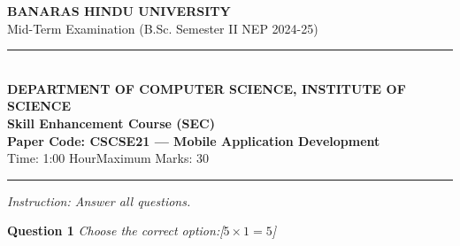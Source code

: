 \documentclass[11pt,a4paper]{article}
\newcommand{\pts}[1]{\hfill   \textit{[#1]}}
\begin{document}
\begin{center}
  {\large\bfseries BANARAS HINDU UNIVERSITY}\\[2pt]
  {\normalsize Mid-Term Examination (B.Sc. Semester II NEP 2024-25)}\\[6pt]
  \rule{0.8\linewidth}{0.5pt}\\[6pt]
  {\large\bfseries DEPARTMENT OF COMPUTER SCIENCE, INSTITUTE OF SCIENCE}\\[4pt]
  {\large\bfseries Skill Enhancement Course (SEC)}\\[4pt]
  {\large\bfseries Paper Code: CSCSE21 --- Mobile Application Development}\\[4pt]
  {\normalsize Time: 1:00 Hour\hfill Maximum Marks: 30}
\end{center}

\rule{\linewidth}{0.4pt}\smallskip



\noindent   \textit{Instruction: Answer all questions.}
\bigskip




\noindent   \textbf{Question 1}   \textit{Choose the correct option:}\pts{$5  \times 1 = 5$}
\end{document}
